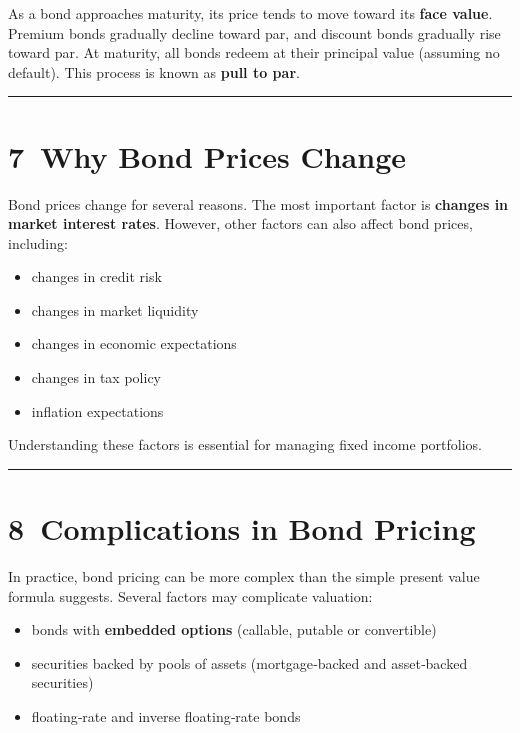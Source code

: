 \documentclass[
  letterpaper,
  DIV=11,
  numbers=noendperiod]{scrartcl}
\providecommand{\tightlist}{%
  \setlength{\itemsep}{0pt}\setlength{\parskip}{0pt}}
\begin{document}
As a bond approaches maturity, its price tends to move toward its
\textbf{face value}. Premium bonds gradually decline toward par, and
discount bonds gradually rise toward par. At maturity, all bonds redeem
at their principal value (assuming no default). This process is known as
\textbf{pull to par}.

\begin{center}\rule{0.5\linewidth}{0.5pt}\end{center}

\section{7~Why Bond Prices Change}\label{why-bond-prices-change}

Bond prices change for several reasons. The most important factor is
\textbf{changes in market interest rates}. However, other factors can
also affect bond prices, including:

\begin{itemize}
\tightlist
\item
  changes in credit risk
\item
  changes in market liquidity
\item
  changes in economic expectations
\item
  changes in tax policy
\item
  inflation expectations
\end{itemize}

Understanding these factors is essential for managing fixed income
portfolios.

\begin{center}\rule{0.5\linewidth}{0.5pt}\end{center}

\section{8~Complications in Bond
Pricing}\label{complications-in-bond-pricing}

In practice, bond pricing can be more complex than the simple present
value formula suggests. Several factors may complicate valuation:

\begin{itemize}
\tightlist
\item
  bonds with \textbf{embedded options} (callable, putable or
  convertible)
\item
  securities backed by pools of assets (mortgage‑backed and asset‑backed
  securities)
\item
  floating‑rate and inverse floating‑rate bonds
\end{itemize}
\end{document}
